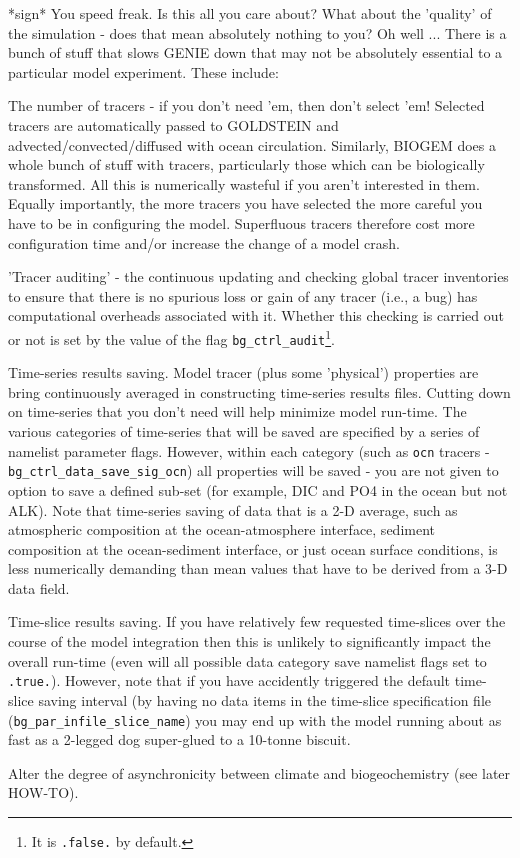 \documentclass[10pt,twoside]{article}
\begin{document}
*sign* You speed freak. Is this all you care about? What about the 'quality' of the simulation - does that mean absolutely nothing to you? Oh well ...
There is a bunch of stuff that slows GENIE down that may not be absolutely essential to a particular model experiment. These include:
\begin{compactenum}
	\item	The number of tracers - if you don't need 'em, then don't select 'em! Selected tracers are automatically passed to GOLDSTEIN and advected/convected/diffused with ocean circulation. Similarly, BIOGEM does a whole bunch of stuff with tracers, particularly those which can be biologically transformed. All this is numerically wasteful if you aren't interested in them. Equally importantly, the more tracers you have selected the more careful you have to be in configuring the model. Superfluous tracers therefore cost more configuration time and/or increase the change of a model crash.
	\item 'Tracer auditing' - the  continuous updating and checking global tracer inventories to ensure that there is no spurious loss or gain of any tracer (i.e., a bug) has computational overheads associated with it. Whether this checking is carried out or not is set by the value of the flag \texttt{bg\_ctrl\_audit}\footnote{It is \texttt{.false.} by default.}.
	\item Time-series results saving. Model tracer (plus some 'physical') properties are bring continuously averaged in constructing time-series results files. Cutting down on time-series that you don't need will help minimize model run-time. The various categories of time-series that will be saved are specified by a series of namelist parameter flags. However, within each category (such as \texttt{ocn} tracers - \texttt{bg\_ctrl\_data\_save\_sig\_ocn}) all properties will be saved - you are not given to option to save a defined sub-set (for example, DIC and PO4 in the ocean but not ALK). Note that time-series saving of data that is a 2-D average, such as atmospheric composition at the ocean-atmosphere interface, sediment composition at the ocean-sediment interface, or just ocean surface conditions, is less numerically demanding than mean values that have to be derived from a 3-D data field.
	\item Time-slice results saving. If you have relatively few requested time-slices over the course of the model integration then this is unlikely to significantly impact the overall run-time (even will all possible data category save namelist flags set to \texttt{.true.}). However, note that if you have accidently triggered the default time-slice saving interval (by having no data items in the time-slice specification file (\texttt{bg\_par\_infile\_slice\_name}) you may end up with the model running about as fast as a 2-legged dog super-glued to a 10-tonne biscuit.
	\item Alter the degree of asynchronicity between climate and biogeochemistry (see later HOW-TO).
\end{compactenum}
\end{document}
